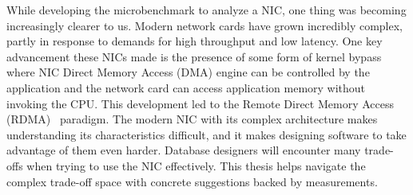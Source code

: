 While developing the microbenchmark to analyze a NIC, one thing was becoming increasingly clearer to us.
Modern network cards have grown incredibly complex, partly in response to
demands for high throughput and low latency. One key advancement these NICs made 
is the presence of some form of kernel bypass where NIC Direct Memory Access (DMA) engine can be 
controlled by the application and the network card can \linebreak access application memory without invoking the CPU. 
This development led to the \linebreak Remote Direct Memory Access (RDMA)~\cite{rdmapatent} paradigm. 
The modern NIC with its \linebreak complex architecture makes understanding its characteristics difficult, 
and it makes \linebreak designing software to take advantage of them even harder. 
Database designers will \linebreak encounter many trade-offs when trying to use the NIC effectively. 
This thesis helps \linebreak navigate the complex trade-off space with concrete suggestions backed by measurements.

